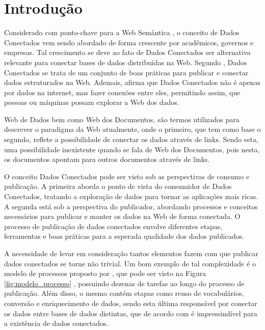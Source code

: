 \chapter{Introdução}
\label{cap:introducao}
Considerado com ponto-chave para a Web Semântica \cite{berners2001semantic}, o conceito de Dados Conectados vem sendo abordado de forma crescente por acadêmicos, governos e empresas. Tal crescimento se deve ao fato de Dados Conectados ser alternativa relevante para conectar bases de dados distribuídas na Web. Segundo , Dados Conectados se trata de um conjunto de boas práticas para publicar e conectar dados estruturados na Web. Ademais,  afirma que Dados Conectados não é apenas por dados na internet, mas fazer conexões entre eles, permitindo assim, que pessoas ou máquinas possam explorar a Web dos dados.

Web de Dados bem como Web dos Documentos, são termos utilizados para descrever o paradigma da Web atualmente, onde o primeiro, que tem como base o segundo, reflete a possibilidade de conectar os dados através de links. Sendo esta, uma possibilidade inexistente quando se fala de Web dos Documentos, pois nesta, os documentos apontam para outros documentos através de links. 

O conceito Dados Conectados pode ser visto sob as perspectivas de consumo e publicação. A primeira aborda o ponto de vista do consumidor de Dados Conectados, tratando a exploração de dados para tornar as aplicações mais ricas. A segunda está sob a perspectiva do publicador, abordando processos \cite{bizer2007publish, hyland2011joy, villazon2011methodological, Avila2015} e conceitos \cite{berners2006linked, wood2014linked} necessários para publicar e manter os dados na Web de forma conectada. O processo de publicação de dados conectados envolve diferentes etapas, ferramentas e boas práticas \cite{world2014best} para a esperada qualidade dos dados publicados. 

A necessidade de levar em consideração tantos elementos fazem com que publicar dados conectados se torne não trivial. Um bom exemplo de tal complexidade é o modelo de processos proposto por , que pode ser visto na Figura \ref{fig:modelo_processo} , possuindo dezenas de tarefas ao longo do processo de publicação. Além disso, o mesmo contém etapas como reuso de vocabulários, conversão  e enriquecimento de dados, sendo esta última responsável por conectar os dados entre bases de dados distintas, que de acordo com  é impressindível para a existência de dados conectados.

